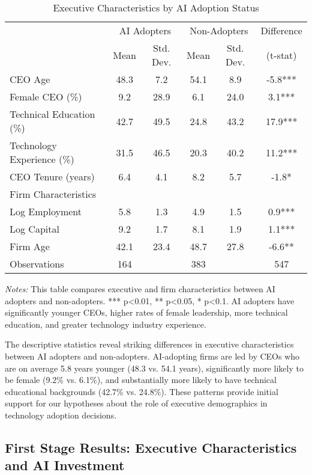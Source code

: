 \documentclass[12pt, a4paper]{article}
\begin{document}
\begin{table}[H]
\centering
\caption{Executive Characteristics by AI Adoption Status}
\label{tab:descriptive_executives}
\begin{tabular}{lccccc}
\toprule
 & \multicolumn{2}{c}{AI Adopters} & \multicolumn{2}{c}{Non-Adopters} & Difference \\
 & Mean & Std. Dev. & Mean & Std. Dev. & (t-stat) \\
\midrule
CEO Age & 48.3 & 7.2 & 54.1 & 8.9 & -5.8*** \\
Female CEO (\%) & 9.2 & 28.9 & 6.1 & 24.0 & 3.1*** \\
Technical Education (\%) & 42.7 & 49.5 & 24.8 & 43.2 & 17.9*** \\
Technology Experience (\%) & 31.5 & 46.5 & 20.3 & 40.2 & 11.2*** \\
CEO Tenure (years) & 6.4 & 4.1 & 8.2 & 5.7 & -1.8* \\
\midrule
Firm Characteristics & & & & & \\
Log Employment & 5.8 & 1.3 & 4.9 & 1.5 & 0.9*** \\
Log Capital & 9.2 & 1.7 & 8.1 & 1.9 & 1.1*** \\
Firm Age & 42.1 & 23.4 & 48.7 & 27.8 & -6.6** \\
\midrule
Observations & 164 & & 383 & & 547 \\
\bottomrule
\end{tabular}
\begin{minipage}{\textwidth}
\footnotesize
\textit{Notes:} This table compares executive and firm characteristics between AI adopters and non-adopters. *** p<0.01, ** p<0.05, * p<0.1. AI adopters have significantly younger CEOs, higher rates of female leadership, more technical education, and greater technology industry experience.
\end{minipage}
\end{table}

The descriptive statistics reveal striking differences in executive characteristics between AI adopters and non-adopters. AI-adopting firms are led by CEOs who are on average 5.8 years younger (48.3 vs. 54.1 years), significantly more likely to be female (9.2\% vs. 6.1\%), and substantially more likely to have technical educational backgrounds (42.7\% vs. 24.8\%). These patterns provide initial support for our hypotheses about the role of executive demographics in technology adoption decisions.

\subsection{First Stage Results: Executive Characteristics and AI Investment}
\end{document}
